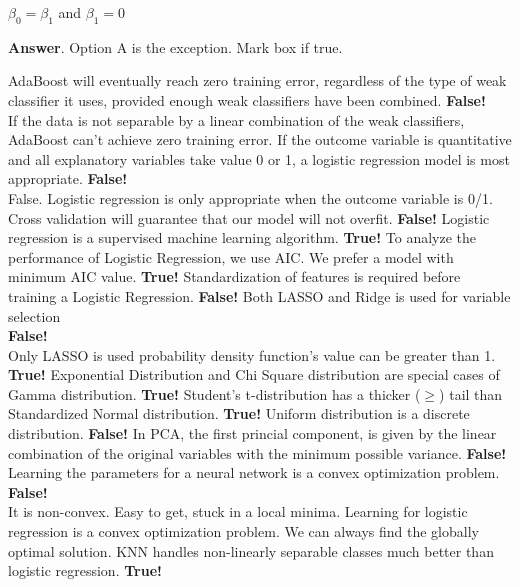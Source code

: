 \documentclass[12pt]{exam}
\begin{document}
\begin{questions}
\begin{oneparchoices}
\choice $\beta_0 = \beta_1$ and $\beta_1 = 0$ \\
\end{oneparchoices}
\textbf{Answer}. Option A is the exception.
\question[12] Mark box if true.
\addpoints
\begin{checkboxes}
\choice AdaBoost will eventually reach zero training error, regardless of the type of weak classifier it uses, provided enough weak classifiers have been combined. 
\textbf{False!}\\
If the data is not separable by a linear combination of the weak classifiers, AdaBoost can’t achieve zero training error. 
\choice If the outcome variable is quantitative and all explanatory variables take value 0 or 1, a logistic regression model is most appropriate.
\textbf{False!}\\
False. Logistic regression is only appropriate when the outcome variable is 0/1.
\choice Cross validation will guarantee that our model will not overfit. 
\textbf{False!}
\choice Logistic regression is a supervised machine learning algorithm.
\textbf{True!}
\choice To analyze the performance of Logistic Regression, we use AIC. We prefer a model with minimum AIC value. 
\textbf{True!}
\choice Standardization of features is required before training a Logistic Regression. 
\textbf{False!}
\choice Both LASSO and Ridge is used for variable selection \\ 
\textbf{False!}\\ Only LASSO is used
\choice probability density function's value can be greater than 1.
\textbf{True!}
\choice Exponential Distribution and Chi Square distribution are special cases of Gamma distribution.
\textbf{True!}
\choice Student's t-distribution has a thicker ($\geq$) tail than Standardized Normal distribution. 
\textbf{True!}
\choice Uniform distribution is a discrete distribution.
\textbf{False!}
\choice In PCA, the first princial component, is given by the linear combination of the original variables with the minimum possible variance.
\textbf{False!}
\choice Learning the parameters for a neural network is a convex optimization problem.
\textbf{False!}\\ It is non-convex. Easy to get, stuck in a local minima. Learning for logistic regression is a convex optimization problem. We can always find the globally optimal solution. 
\choice KNN handles non-linearly separable classes much better than logistic regression.
\textbf{True!}\\
\end{checkboxes}




\end{questions}
\end{document}

